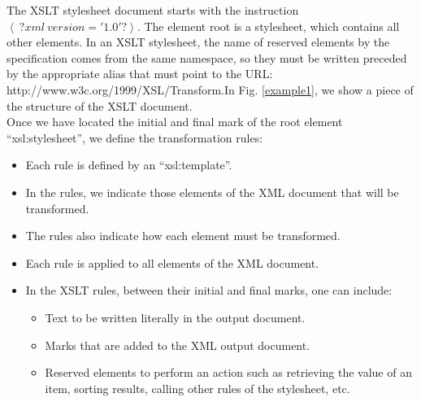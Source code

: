 %
The XSLT stylesheet document starts with the instruction $\left <\ ? xml\ version ='1.0' ? \right >$. The element root is a stylesheet, which contains all other elements. In an XSLT stylesheet, the name of reserved elements by the specification comes from the same namespace, so they must be written preceded by the appropriate alias that must point to the URL: http://www.w3c.org/1999/XSL/Transform.\newline In Fig. \ref{example1}, we show a piece of the structure of the XSLT document.\\
Once we have located the initial and final mark of the root element ``xsl:stylesheet'', we define the transformation rules:

\begin{itemize}
\item
Each rule is defined by an ``xsl:template''.
\item
In the rules, we indicate those elements of the XML document that will be transformed.
\item
The rules also indicate how each element must be transformed.
\item
Each rule is applied to all elements of the XML document.
\item
In the XSLT rules, between their initial and final marks, one can include:
\begin{itemize}
\item
Text to be written literally in the output document.
\item
Marks that are added to the XML output document.
\item
Reserved elements to perform an action such as retrieving the value of an item, sorting results, calling other rules of the stylesheet, etc.
\end{itemize}
\end{itemize} 

